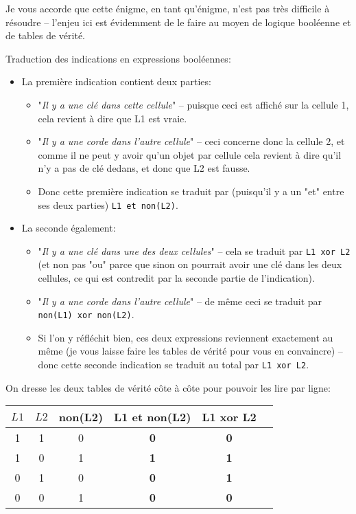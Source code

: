 \documentclass[12pt]{article}
\begin{document}
	\begin{MaReponse}
		Je vous accorde que cette énigme, en tant qu'énigme, n'est pas très difficile à résoudre -- l'enjeu ici est évidemment de le faire au moyen de logique booléenne et de tables de vérité.
		\begin{alphenum}
			\item Traduction des indications en expressions booléennes:
			
			\begin{itemize}
				\item La première indication contient deux parties:
				\begin{itemize}
					\item "\textit{Il y a une clé dans cette cellule}" -- puisque ceci est affiché sur la cellule 1, cela revient à dire que L1 est vraie.
					\item "\textit{Il y a une corde dans l’autre cellule}" -- ceci concerne donc la cellule 2, et comme il ne peut y avoir qu'un objet par cellule cela revient à dire qu'il n'y a pas de clé dedans, et donc que L2 est fausse.
					\item Donc cette première indication se traduit par (puisqu'il y a un "et" entre ses deux parties) \texttt{L1 et non(L2)}.
				\end{itemize}
				\item La seconde également:
				\begin{itemize}
					\item "\textit{Il y a une clé dans une des deux cellules}" -- cela se traduit par \texttt{L1 xor L2} (et non pas "ou" parce que sinon on pourrait avoir une clé dans les deux cellules, ce qui est contredit par la seconde partie de l'indication).
					\item "\textit{Il y a une corde dans l’autre cellule}" -- de même ceci se traduit par \texttt{non(L1) xor non(L2)}.
					\item Si l'on y réfléchit bien, ces deux expressions reviennent exactement au même (je vous laisse faire les tables de vérité pour vous en convaincre) -- donc cette seconde indication se traduit au total par \texttt{L1 xor L2}.
				\end{itemize}
			\end{itemize}
			\item On dresse les deux tables de vérité côte à côte pour pouvoir les lire par ligne:
			\begin{center}		
				\begin{tabular}{|c|c|c|c|c|c|}
					\hline
					$L1$ & $L2$ & non(L2) & \textbf{L1 et non(L2)} & \textbf{L1 xor L2} \\ \hline
					1 & 1 & 0 & \textbf{0} & \textbf{0}  \\ \hline
					1 & 0& 1 & \textbf{1} & \textbf{1}  \\ \hline
					0 & 1 & 0 & \textbf{0} & \textbf{1} \\ \hline
					0 & 0 & 1 & \textbf{0} & \textbf{0}  \\ \hline
				\end{tabular}
			\end{center}
			

\end{alphenum}
\end{MaReponse}
\end{document}
